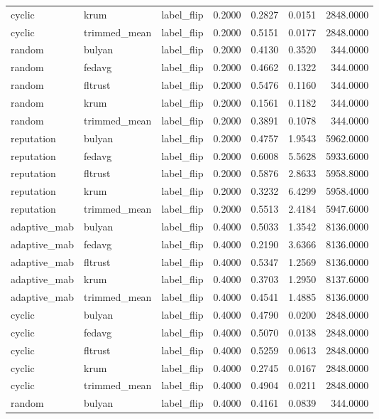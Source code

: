 \begin{tabular}{lllrrrr}
cyclic & krum & label_flip & 0.2000 & 0.2827 & 0.0151 & 2848.0000 \\
cyclic & trimmed_mean & label_flip & 0.2000 & 0.5151 & 0.0177 & 2848.0000 \\
random & bulyan & label_flip & 0.2000 & 0.4130 & 0.3520 & 344.0000 \\
random & fedavg & label_flip & 0.2000 & 0.4662 & 0.1322 & 344.0000 \\
random & fltrust & label_flip & 0.2000 & 0.5476 & 0.1160 & 344.0000 \\
random & krum & label_flip & 0.2000 & 0.1561 & 0.1182 & 344.0000 \\
random & trimmed_mean & label_flip & 0.2000 & 0.3891 & 0.1078 & 344.0000 \\
reputation & bulyan & label_flip & 0.2000 & 0.4757 & 1.9543 & 5962.0000 \\
reputation & fedavg & label_flip & 0.2000 & 0.6008 & 5.5628 & 5933.6000 \\
reputation & fltrust & label_flip & 0.2000 & 0.5876 & 2.8633 & 5958.8000 \\
reputation & krum & label_flip & 0.2000 & 0.3232 & 6.4299 & 5958.4000 \\
reputation & trimmed_mean & label_flip & 0.2000 & 0.5513 & 2.4184 & 5947.6000 \\
adaptive_mab & bulyan & label_flip & 0.4000 & 0.5033 & 1.3542 & 8136.0000 \\
adaptive_mab & fedavg & label_flip & 0.4000 & 0.2190 & 3.6366 & 8136.0000 \\
adaptive_mab & fltrust & label_flip & 0.4000 & 0.5347 & 1.2569 & 8136.0000 \\
adaptive_mab & krum & label_flip & 0.4000 & 0.3703 & 1.2950 & 8137.6000 \\
adaptive_mab & trimmed_mean & label_flip & 0.4000 & 0.4541 & 1.4885 & 8136.0000 \\
cyclic & bulyan & label_flip & 0.4000 & 0.4790 & 0.0200 & 2848.0000 \\
cyclic & fedavg & label_flip & 0.4000 & 0.5070 & 0.0138 & 2848.0000 \\
cyclic & fltrust & label_flip & 0.4000 & 0.5259 & 0.0613 & 2848.0000 \\
cyclic & krum & label_flip & 0.4000 & 0.2745 & 0.0167 & 2848.0000 \\
cyclic & trimmed_mean & label_flip & 0.4000 & 0.4904 & 0.0211 & 2848.0000 \\
random & bulyan & label_flip & 0.4000 & 0.4161 & 0.0839 & 344.0000 \\

\end{tabular}
